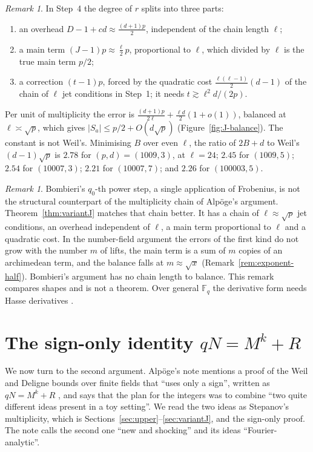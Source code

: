\documentclass[11pt]{amsbook}
\theoremstyle{plain}
\theoremstyle{definition}
\theoremstyle{remark}
\newtheorem{remark}[theorem]{Remark}
\numberwithin{equation}{section}
\numberwithin{figure}{chapter}
\numberwithin{table}{chapter}
\newcommand{\F}{\mathbb{F}}
\begin{document}
\begin{remark}\label{rem:J-balance}
In Step~4 the degree of $r$ splits into three parts:
\begin{enumerate}
\item an overhead $D-1+cd\approx\frac{(d+1)p}2$, independent of
the chain length $\ell$;
\item a main term $(J-1)p\approx\frac\ell2p$, proportional to
$\ell$, which divided by $\ell$ is the true main term $p/2$;
\item a correction $(t-1)p$, forced by the quadratic cost
$\frac{\ell(\ell-1)}2(d-1)$ of the chain of $\ell$ jet conditions
in Step~1; it needs $t\gtrsim\ell^2d/(2p)$.
\end{enumerate}
Per unit of multiplicity the error is
$\frac{(d+1)p}{2\ell}+\frac{\ell d}2(1+o(1))$, balanced at
$\ell\asymp\sqrt p$, which gives
$\lvert S_a\rvert\le p/2+O(d\sqrt p)$
(Figure~\ref{fig:J-balance}). The constant is not Weil's. Minimising
$B$ over even $\ell$, the ratio of $2B+d$ to Weil's $(d-1)\sqrt p$ is
$2.78$ for $(p,d)=(1009,3)$, at $\ell=24$; $2.45$ for $(1009,5)$;
$2.54$ for $(10007,3)$; $2.21$ for $(10007,7)$; and $2.26$ for
$(100003,5)$.
\end{remark}

\begin{remark}\label{rem:frobenius-chain}
Bombieri's $q_0$-th power step, a single application of Frobenius,
is not the structural counterpart of the multiplicity chain of
Alp\"oge's argument. Theorem~\ref{thm:variantJ} matches that chain
better. It has a chain of $\ell\approx\sqrt p$ jet conditions, an
overhead independent of $\ell$, a main term proportional to $\ell$
and a quadratic cost. In the number-field argument the errors of
the first kind do not grow with the number $m$ of lifts, the main
term is a sum of $m$ copies of an archimedean term, and the balance
falls at $m\approx\sqrt x$ (Remark~\ref{rem:exponent-half}).
Bombieri's argument has no chain length to balance. This remark
compares shapes and is not a theorem. Over general $\F_q$ the
derivative form needs Hasse derivatives \cite{Schmidt1976}.
\end{remark}

\section{The sign-only identity
  \texorpdfstring{$qN = M^k + R$}{qN = M\textasciicircum k + R}}
\label{sec:identity}

We now turn to the second argument. Alp\"oge's note mentions a proof
of the Weil and Deligne bounds over finite fields that ``uses only
a sign'', written as $qN = M^k + R$ \cite{AlpogeRemark2026}, and
says that the plan for the integers was to combine ``two quite
different ideas present in a toy setting''. We read the two ideas
as Stepanov's multiplicity, which is
Sections~\ref{sec:upper}--\ref{sec:variantJ}, and the sign-only
proof. The note calls the second one ``new and shocking'' and its
ideas ``Fourier-analytic''.
\end{document}
